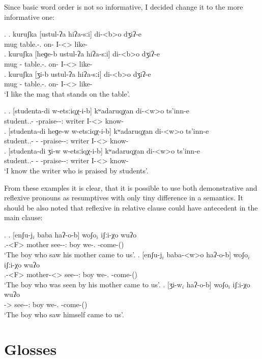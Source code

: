 Since basic word order is not so informative, I decided change it to the more informative one:

\ex.
	\ag. kuruʃka [ustul-ʔa hiʔa-sːi] di-<b>o dʒiʔ-e\\
			mug {table.\Obl-\Super.\Ess} {on-\Attr} {I-<\Nanf>\Aff} {like-\Hab}\\
	\bg. kuruʃka [heɡe-b ustul-ʔa hiʔa-sːi] di-<b>o dʒiʔ-e\\
			mug {\Dem-\Nanf} {table.\Obl-\Super.\Ess} {on-\Attr} {I-<\Nanf>\Aff} {like-\Hab}\\
	\bg. kuruʃka [ʒi-b ustul-ʔa hiʔa-sːi] di-<b>o dʒiʔ-e\\
			mug {\Rfl-\Nanf} {table.\Obl-\Super.\Ess} {on-\Attr} {I-<\Nanf>\Aff} {like-\Hab}\\
			\glt `I like the mag that stands on the table'.

\ex.
	\ag. [studenta-di w-etsːiqχ-i-b] kʷadaruqχan di-<w>o ts'inn-e\\
			{student.\Pl.\Obl-\Erg} {\M-praise-\Pst-\Ptcp:\Pst} writer {I-<\M>\Aff} {know-\Hab}\\
	\bg. [studenta-di heɡe-w w-etsːiqχ-i-b] kʷadaruqχan di-<w>o ts'inn-e\\
			{student.\Pl.\Obl-\Erg} {\Dem-\M} {\M-praise-\Pst-\Ptcp:\Pst} writer {I-<\M>\Aff} {know-\Hab}\\
	\bg. [studenta-di ʒi-w w-etsːiqχ-i-b] kʷadaruqχan di-<w>o ts'inn-e\\
			{student.\Pl.\Obl-\Erg} {\Rfl-\M} {\M-praise-\Pst-\Ptcp:\Pst} writer {I-<\M>\Aff} {know-\Hab}\\
			`I know the writer who is praised by students'.

From these examples it is clear, that it is possible to use both demonstrative and reflexive pronouns as resumptives with only tiny difference in a semantics. It should be also noted that reflexive in relative clause could have antecedent in the main clause:

\ex.
	\ag. [enʃu-j$_i$ baba haʔ-o-b] woʃo$_i$ iʃːi-χo wuʔo\\
			 {\Rfl.\Obl-<F>\Gen} mother {see-\Pst-\Ptcp:\Pst} boy {we-\Add.\Lat} {\M-come-\Pst(\Aor)}\\
			 \glt `The boy who saw his mother came to us'.
	\bg. [enʃu-j$_i$ baba-<w>o haʔ-o-b] woʃo$_i$ iʃːi-χo wuʔo\\
			 {\Rfl.\Obl-<F>\Gen} {mother-<\M>\Aff} {see-\Pst-\Ptcp:\Pst} boy {we-\Add.\Lat} {\M-come-\Pst(\Aor)}\\
			 \glt `The boy who was seen by his mother came to us'.
	\bg. [ʒi-w$_i$ haʔ-o-b] woʃo$_i$ iʃːi-χo wuʔo\\
			 {\Rfl-\M>} {see-\Pst-\Ptcp:\Pst} boy {we-\Add.\Lat} {\M-come-\Pst(\Aor)}\\
			 \glt `The boy who saw himself came to us'.
			 
\section*{Glosses}
\small
\printglosses


\normalsize
